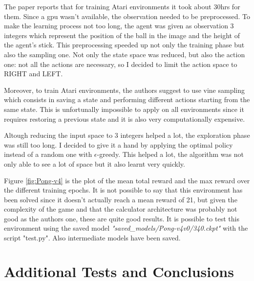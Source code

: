 \documentclass[12pt,a4paper]{article}
\begin{document}
The paper reports that for training Atari environments it took about 30hrs for them. Since a gpu wasn't available, the observation needed to be preprocessed. To make the learning process not too long, the agent was given as observation 3 integers which represent the position of the ball in the image and the height of the agent's stick. This preprocessing speeded up not only the training phase but also the sampling one. Not only the state space was reduced, but also the action one: not all the actions are necessary, so I decided to limit the action space to RIGHT and LEFT.

Moreover, to train Atari environments, the authors suggest to use vine sampling which consists in saving a state and performing different actions starting from the same state. This is unfortunally impossible to apply on all environments since it requires restoring a previous state and it is also very computationally expensive.

Altough reducing the input space to 3 integers helped a lot, the exploration phase was still too long. I decided to give it a hand by applying the optimal policy instead of a random one with $\epsilon$-greedy. This helped a lot, the algorithm was not only able to see a lot of space but it also learnt very quickly.

Figure \ref{fig:Pong-v4} is the plot of the mean total reward and the max reward over the different training epochs.
It is not possible to say that this environment has been solved since it doesn't actually reach a mean reward of 21, but given the complexity of the game and that the calculator architecture was probably not good as the authors one, these are quite good results.
It is possible to test this environment using the saved model \textit{"saved\_models/Pong-v4\-v0/340.ckpt"} with the script "test.py". Also intermediate models have been saved.


\section{Additional Tests and Conclusions}
\end{document}
